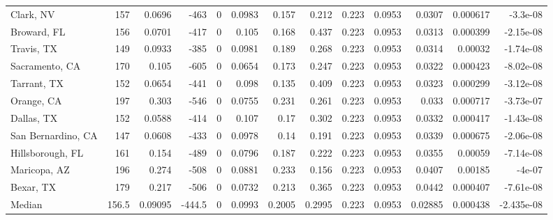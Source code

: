 \documentclass[12pt,letterpaper]{article}
\begin{document}
{\begin{appendices}
\begin{sidewaystable}
{\begin{tabular}{lrrrrrrrrrrrr}
 Clark, NV          & 157   & 0.0696  & -463   &     0 &          0.0983 &           0.157  &         0.212  &              0.223 &             0.0953 &           0.0307  &        0.000617 &       -3.3e-08   \\
 Broward, FL        & 156   & 0.0701  & -417   &     0 &          0.105  &           0.168  &         0.437  &              0.223 &             0.0953 &           0.0313  &        0.000399 &       -2.15e-08  \\
 Travis, TX         & 149   & 0.0933  & -385   &     0 &          0.0981 &           0.189  &         0.268  &              0.223 &             0.0953 &           0.0314  &        0.00032  &       -1.74e-08  \\
 Sacramento, CA     & 170   & 0.105   & -605   &     0 &          0.0654 &           0.173  &         0.247  &              0.223 &             0.0953 &           0.0322  &        0.000423 &       -8.02e-08  \\
 Tarrant, TX        & 152   & 0.0654  & -441   &     0 &          0.098  &           0.135  &         0.409  &              0.223 &             0.0953 &           0.0323  &        0.000299 &       -3.12e-08  \\
 Orange, CA         & 197   & 0.303   & -546   &     0 &          0.0755 &           0.231  &         0.261  &              0.223 &             0.0953 &           0.033   &        0.000717 &       -3.73e-07  \\
 Dallas, TX         & 152   & 0.0588  & -414   &     0 &          0.107  &           0.17   &         0.302  &              0.223 &             0.0953 &           0.0332  &        0.000417 &       -1.43e-08  \\
 San Bernardino, CA & 147   & 0.0608  & -433   &     0 &          0.0978 &           0.14   &         0.191  &              0.223 &             0.0953 &           0.0339  &        0.000675 &       -2.06e-08  \\
 Hillsborough, FL   & 161   & 0.154   & -489   &     0 &          0.0796 &           0.187  &         0.222  &              0.223 &             0.0953 &           0.0355  &        0.00059  &       -7.14e-08  \\
 Maricopa, AZ       & 196   & 0.274   & -508   &     0 &          0.0881 &           0.233  &         0.156  &              0.223 &             0.0953 &           0.0407  &        0.00185  &       -4e-07     \\
 Bexar, TX          & 179   & 0.217   & -506   &     0 &          0.0732 &           0.213  &         0.365  &              0.223 &             0.0953 &           0.0442  &        0.000407 &       -7.61e-08  \\
\hline
 Median             & 156.5 & 0.09095 & -444.5 &     0 &          0.0993 &           0.2005 &         0.2995 &              0.223 &             0.0953 &           0.02885 &        0.000438 &       -2.435e-08 \\
\hline
\end{tabular}

}
\end{sidewaystable}
\end{appendices}}
\end{document}

